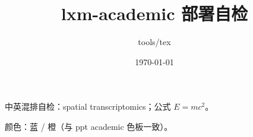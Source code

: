 \documentclass[11pt]{article}
\title{lxm-academic 部署自检}
\author{tools/tex}
\date{\today}
\begin{document}
\maketitle

中英混排自检：spatial transcriptomics；公式 $E=mc^2$。

颜色：{\color{lxmBlue}蓝} / {\color{lxmOrange}橙}（与 ppt academic 色板一致）。
\end{document}
